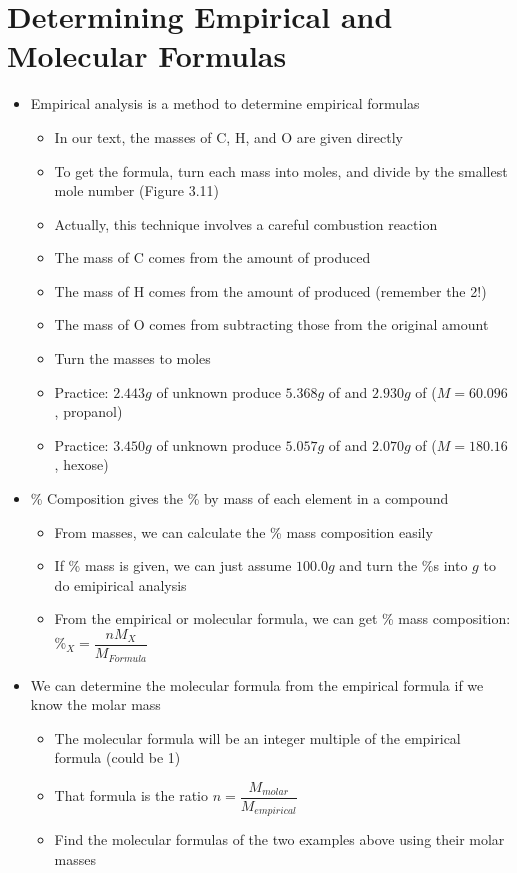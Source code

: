 \documentclass[12pt, openany, letterpaper]{memoir}
\begin{document}
\section{Determining Empirical and Molecular Formulas}
\begin{itemize}
  \item Empirical analysis is a method to determine empirical formulas
  \begin{itemize}
    \item In our text, the masses of C, H, and O are given directly
    \item To get the formula, turn each mass into moles, and divide by the smallest mole number (Figure 3.11)
    \item Actually, this technique involves a careful combustion reaction
    \item The mass of C comes from the amount of  produced
    \item The mass of H comes from the amount of  produced (remember the 2!)
    \item The mass of O comes from subtracting those from the original amount
    \item Turn the masses to moles
    \item Practice: $2.443g$ of unknown produce $5.368g$ of  and $2.930g$ of  ($M=60.096$, propanol)
    \item Practice: $3.450g$ of unknown produce $5.057g$ of  and $2.070g$ of  ($M=180.16$, hexose)
  \end{itemize}
  \item \% Composition gives the \% by mass of each element in a compound
  \begin{itemize}
    \item From masses, we can calculate the \% mass composition easily
    \item If \% mass is given, we can just assume $100.0g$ and turn the \%s into $g$ to do emipirical analysis
    \item From the empirical or molecular formula, we can get \% mass composition: $\%_X=\dfrac{nM_X}{M_{Formula}}$
  \end{itemize}
  \item We can determine the molecular formula from the empirical formula if we know the molar mass
  \begin{itemize}
    \item The molecular formula will be an integer multiple of the empirical formula (could be 1)
    \item That formula is the ratio $n=\dfrac{M_{molar}}{M_{empirical}}$
    \item Find the molecular formulas of the two examples above using their molar masses
  \end{itemize}
\end{itemize}
\end{document}

